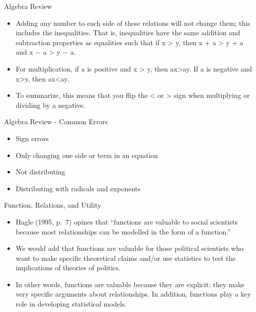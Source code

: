\documentclass[
  ignorenonframetext,
]{beamer}
\begin{document}
\begin{frame}{Algebra Review}
\protect\hypertarget{algebra-review-3}{}

\begin{itemize}
\item
  Adding any number to each side of these relations will not change
  them; this includes the inequalities. That is, inequalities have the
  same addition and subtraction properties as equalities such that if x
  \textgreater{} y, then x + a \textgreater{} y + a and x − a
  \textgreater{} y − a.
\item
  For multiplication, if a is positive and x \textgreater{} y, then
  ax\textgreater ay. If a is negative and x\textgreater y, then
  ax\textless ay.
\item
  To summarize, this means that you flip the \textless{} or
  \textgreater{} sign when multiplying or dividing by a negative.
\end{itemize}

\end{frame}

\begin{frame}{Algebra Review - Common Errors}
\protect\hypertarget{algebra-review---common-errors}{}

\begin{itemize}
\item
  Sign errors
\item
  Only changing one side or term in an equation
\item
  Not distributing
\item
  Distributing with radicals and exponents
\end{itemize}

\end{frame}

\begin{frame}{Function, Relations, and Utility}
\protect\hypertarget{function-relations-and-utility}{}

\begin{itemize}
\item
  Hagle (1995, p.~7) opines that ``functions are valuable to social
  scientists because most relationships can be modelled in the form of a
  function.''
\item
  We would add that functions are valuable for those political
  scientists who want to make specific theoretical claims and/or use
  statistics to test the implications of theories of politics.
\item
  In other words, functions are valuable because they are explicit: they
  make very specific arguments about relationships. In addition,
  functions play a key role in developing statistical models.
\end{itemize}

\end{frame}
\end{document}
